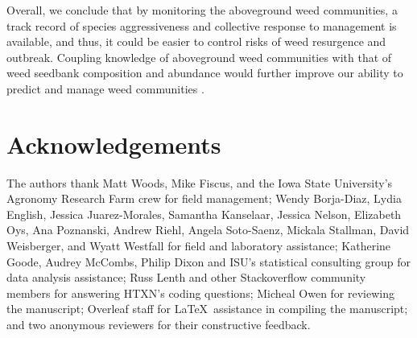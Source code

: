 \documentclass[
]{article}
\begin{document}
Overall, we conclude that by monitoring the aboveground weed communities, a track record of species aggressiveness and collective response to management is available, and thus, it could be easier to control risks of weed resurgence and outbreak. Coupling knowledge of aboveground weed communities with that of weed seedbank composition and abundance would further improve our ability to predict and manage weed communities \citep{forcellaWeedSeedbanksCorn1992, menalledWeedAbovegroundSeedbank2001, forcellaDebitingSeedbankPriorities2003, davisWeedSeedbankCommunity2005}.

\hypertarget{acknowledgements}{%
\section*{Acknowledgements}\label{acknowledgements}}

The authors thank Matt Woods, Mike Fiscus, and the Iowa State University's Agronomy Research Farm crew for field management; Wendy Borja-Diaz, Lydia English, Jessica Juarez-Morales, Samantha Kanselaar, Jessica Nelson, Elizabeth Oys, Ana Poznanski, Andrew Riehl, Angela Soto-Saenz, Mickala Stallman, David Weisberger, and Wyatt Westfall for field and laboratory assistance; Katherine Goode, Audrey McCombs, Philip Dixon and ISU's statistical consulting group for data analysis assistance; Russ Lenth and other Stackoverflow community members for answering HTXN's coding questions; Micheal Owen for reviewing the manuscript; Overleaf staff for \LaTeX~assistance in compiling the manuscript; and two anonymous reviewers for their constructive feedback.

\renewcommand\refname{References}
  
\end{document}
